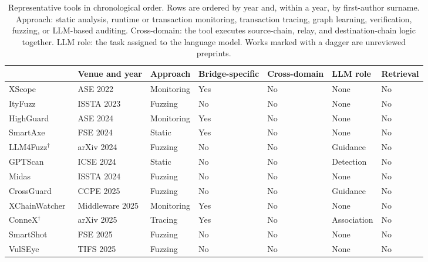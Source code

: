 \documentclass[a4paper]{cas-sc}
\newcommand{\hd}[1]{{\bfseries\boldmath #1}}
\begin{document}
\begin{table}[pos=t,belowcap=4pt]
\centering
\caption{Representative tools in chronological order. Rows are ordered by year and, within a year, by first-author surname. Approach: static analysis, runtime or transaction monitoring, transaction tracing, graph learning, verification, fuzzing, or LLM-based auditing. Cross-domain: the tool executes source-chain, relay, and destination-chain logic together. LLM role: the task assigned to the language model. Works marked with a dagger are unreviewed preprints.}
\label{tab:rw-positioning}
\footnotesize
\setlength{\tabcolsep}{4pt}
\begin{tabularx}{\textwidth}{@{}>{\raggedright\arraybackslash}X>{\raggedright\arraybackslash}p{2.05cm}>{\raggedright\arraybackslash}p{1.75cm}>{\centering\arraybackslash}p{1.35cm}>{\centering\arraybackslash}p{1.35cm}>{\raggedright\arraybackslash}p{2.0cm}>{\centering\arraybackslash}p{1.25cm}@{}}
\toprule
\hd{Tool} & \hd{Venue and year} & \hd{Approach} & \hd{Bridge-specific} & \hd{Cross-domain} & \hd{LLM role} & \hd{Retrieval} \\
\midrule
XScope~\citep{zhang2022xscope} & ASE 2022 & Monitoring & Yes & No & None & No \\
ItyFuzz~\citep{shou2023ityfuzz} & ISSTA 2023 & Fuzzing & No & No & None & No \\
HighGuard~\citep{eshghie2024highguard} & ASE 2024 & Monitoring & Yes & No & None & No \\
SmartAxe~\citep{liao2024smartaxe} & FSE 2024 & Static & Yes & No & None & No \\
LLM4Fuzz$^\dagger$~\citep{shou2024llm4fuzz} & arXiv 2024 & Fuzzing & No & No & Guidance & No \\
GPTScan~\citep{sun2024gptscan} & ICSE 2024 & Static & No & No & Detection & No \\
Midas~\citep{ye2024midas} & ISSTA 2024 & Fuzzing & No & No & None & No \\
CrossGuard~\citep{ali2025crossguard} & CCPE 2025 & Fuzzing & No & No & Guidance & No \\
XChainWatcher~\citep{augusto2025xchainwatcher} & Middleware 2025 & Monitoring & Yes & No & None & No \\
ConneX$^\dagger$~\citep{liang2025connex} & arXiv 2025 & Tracing & Yes & No & Association & No \\
SmartShot~\citep{liang2025smartshot} & FSE 2025 & Fuzzing & No & No & None & No \\
VulSEye~\citep{liang2025vulseye} & TIFS 2025 & Fuzzing & No & No & None & No \\

\end{tabularx}
\end{table}
\end{document}
